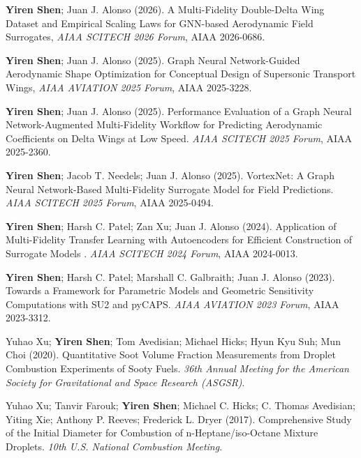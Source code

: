 \begin{cvitems}
\setlength{\itemsep}{1em} %
\paragraphstyle

\item \textbf{Yiren Shen}; Juan J. Alonso (2026). A Multi-Fidelity Double-Delta Wing Dataset and Empirical Scaling Laws for GNN-based Aerodynamic Field Surrogates, \textit{AIAA SCITECH 2026 Forum}, AIAA 2026-0686.
\item \textbf{Yiren Shen}; Juan J. Alonso (2025). Graph Neural Network-Guided Aerodynamic Shape Optimization for Conceptual Design of Supersonic Transport Wings, \textit{AIAA AVIATION 2025 Forum}, AIAA 2025-3228.

\item \textbf{Yiren Shen}; Juan J. Alonso (2025). Performance Evaluation of a Graph Neural Network-Augmented Multi-Fidelity Workflow for Predicting Aerodynamic Coefficients on Delta Wings at Low Speed. \textit{AIAA SCITECH 2025 Forum}, AIAA 2025-2360.

\item \textbf{Yiren Shen}; Jacob T. Needels; Juan J. Alonso (2025). VortexNet: A Graph Neural Network-Based Multi-Fidelity Surrogate Model for Field Predictions. \textit{AIAA SCITECH 2025 Forum}, AIAA 2025-0494.

\item \textbf{Yiren Shen}; Harsh C. Patel; Zan Xu; Juan J. Alonso (2024). Application of Multi-Fidelity Transfer Learning with Autoencoders for Efficient Construction of Surrogate Models
. \textit{AIAA SCITECH 2024 Forum}, AIAA 2024-0013.

\item \textbf{Yiren Shen}; Harsh C. Patel; Marshall C. Galbraith; Juan J. Alonso (2023). Towards a Framework for Parametric Models and Geometric Sensitivity Computations with SU2 and pyCAPS. \textit{AIAA AVIATION 2023 Forum}, AIAA 2023-3312.

\item Yuhao Xu; \textbf{Yiren Shen}; Tom Avedisian; Michael Hicks; Hyun Kyu Suh; Mun Choi (2020). Quantitative Soot Volume Fraction Measurements from Droplet Combustion Experiments of Sooty Fuels. \textit{36th Annual Meeting for the American Society for Gravitational and Space Research (ASGSR)}.

\item Yuhao Xu; Tanvir Farouk; \textbf{Yiren Shen}; Michael C. Hicks; C. Thomas Avedisian; Yiting Xie; Anthony P. Reeves; Frederick L. Dryer (2017). Comprehensive Study of the Initial Diameter for Combustion of n-Heptane/iso-Octane Mixture Droplets. \textit{10th U.S. National Combustion Meeting}.



\end{cvitems}
\vspace{15pt}


